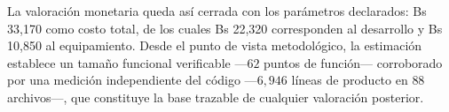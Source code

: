 La valoración monetaria queda así cerrada con los parámetros declarados: Bs
33,170 como costo total, de los cuales Bs 22,320 corresponden al desarrollo y
Bs 10,850 al equipamiento. Desde el punto de vista metodológico, la estimación
establece un tamaño funcional verificable ---$62$ puntos de función--- corroborado
por una medición independiente del código ---$6{,}946$ líneas de producto en $88$
archivos---, que constituye la base trazable de cualquier valoración posterior.
